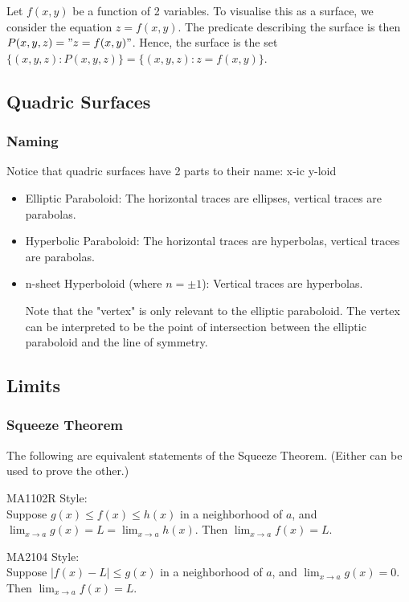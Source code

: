 \documentclass{article}
\begin{document}
Let $f(x,y)$ be a function of 2 variables. To visualise this as a surface, we consider the equation $z=f(x,y)$. The predicate describing the surface is then $P(x,y,z)="z=f(x,y)"$. Hence, the surface is the set $\{(x,y,z):P(x,y,z)\}=\{(x,y,z):z=f(x,y)\}$.

\subsection{Quadric Surfaces}
\subsubsection{Naming}
Notice that quadric surfaces have 2 parts to their name: x-ic y-loid\\
\begin{itemize}
	\item Elliptic Paraboloid: The horizontal traces are ellipses, vertical traces are parabolas.
	\item Hyperbolic Paraboloid: The horizontal traces are hyperbolas, vertical traces are parabolas. 
	\item n-sheet Hyperboloid (where $n=\pm 1$): Vertical traces are hyperbolas.
	
Note that the "vertex" is only relevant to the elliptic paraboloid. The vertex can be interpreted to be the point of intersection between the elliptic paraboloid and the line of symmetry.
\end{itemize}

\subsection{Limits}
\subsubsection{Squeeze Theorem}
The following are equivalent statements of the Squeeze Theorem. (Either can be used to prove the other.)

MA1102R Style:\\
Suppose $g(x)\leq f(x)\leq h(x)$ in a neighborhood of $a$, and $\lim_{x\rightarrow a}g(x)=L=\lim_{x\rightarrow a}h(x)$. Then $\lim_{x\rightarrow a}f(x)=L$.

MA2104 Style:\\
Suppose $|f(x)-L|\leq g(x)$ in a neighborhood of $a$, and $\lim_{x\rightarrow a}g(x)=0$. Then $\lim_{x\rightarrow a}f(x)=L$.
\end{document}
